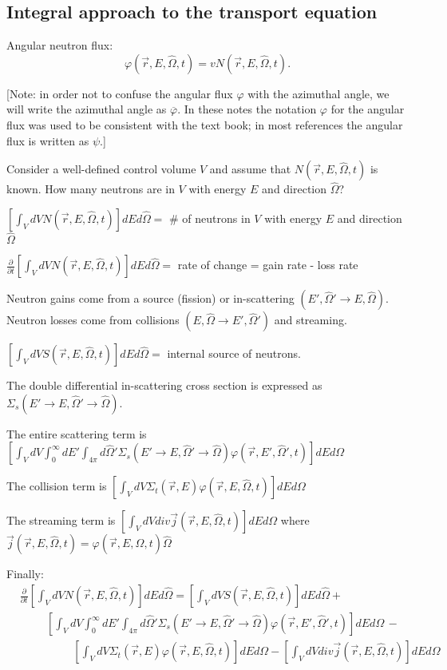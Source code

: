 \documentclass[12pt]{article}
\newcommand{\rvec}{\ensuremath{\vec{r}}}
\newcommand{\omvec}{\ensuremath{\hat{\Omega}}}
\begin{document}
\subsection*{Integral approach to the transport equation}

Angular neutron flux:
\[
\varphi(\rvec, E, \omvec, t)=vN(\rvec, E, \omvec, t).
\] 

[Note: in order not to confuse the angular flux $\varphi$ with the azimuthal angle, we will write the azimuthal angle as $\overline{\varphi}$. In these notes the notation $\varphi$ for the angular flux was used to be consistent with the text book; in most references the angular flux is written as $\psi$.]

Consider a well-defined control volume $V$ and assume that $N(\rvec, E, \omvec, t)$ is known. How many neutrons are in $V$ with energy $E$ and direction $\omvec$?

$\left[\int_V dV N(\rvec, E, \omvec, t)\right] dEd\omvec =$ \# of neutrons in $V$ with energy $E$ and direction $\omvec$

$\frac{\partial}{\partial t}\left[\int_V dV N(\rvec, E, \omvec, t)\right] dEd\omvec =$ rate of change  = gain rate - loss rate

Neutron gains come from a source (fission) or in-scattering $(E', \omvec' \rightarrow E, \omvec)$. Neutron losses come from collisions $(E, \omvec \rightarrow E', \omvec')$ and streaming.

$\left[\int_V dV S(\rvec, E, \omvec, t)\right] dEd\omvec =$ internal source of neutrons.

The double differential in-scattering cross section is expressed as $\Sigma_s(E'\rightarrow E, \omvec'\rightarrow\omvec)$.

The entire scattering term is
$\left[\int_VdV\int_0^{\infty}dE'\int_{4\pi}d\omvec'\Sigma_s(E'\rightarrow E,\omvec'\rightarrow\omvec)\varphi(\rvec,E',\omvec',t)\right]dEd\Omega$

The collision term is
$\left[\int_VdV\Sigma_{t}(\rvec,E)\varphi(\rvec,E,\omvec,t)\right]dEd\Omega$

The streaming term is
$\left[\int_VdV div \vec{j}(\rvec, E, \omvec,t)\right]dEd\Omega$ where $\vec{j}(\rvec,E,\omvec,t)=\varphi(\rvec,E,\omvec,t)\omvec$

Finally:
\begin{align*}
&\frac{\partial}{\partial t}\left[\int_V dV N(\rvec, E, \omvec, t)\right] dEd\omvec =
\left[\int_V dV S(\rvec, E, \omvec, t)\right] dEd\omvec +
\\& \hspace{1cm} \left[\int_VdV\int_0^{\infty}dE'\int_{4\pi}d\omvec'\Sigma_s(E'\rightarrow E,\omvec'\rightarrow\omvec)\varphi(\rvec,E',\omvec',t)\right]dEd\Omega \,-
\\& \hspace{2cm}\left[\int_VdV\Sigma_{t}(\rvec,E)\varphi(\rvec,E,\omvec,t)\right]dEd\Omega - \left[\int_VdV div \vec{j}(\rvec, E, \omvec,t)\right]dEd\Omega
\end{align*}
\end{document}

